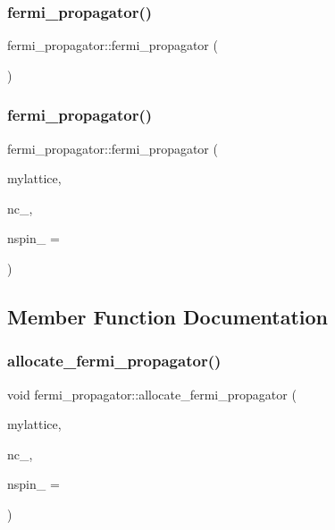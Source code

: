 \subsubsection{\texorpdfstring{fermi\+\_\+propagator()}{fermi\_propagator()}\hspace{0.1cm}{\footnotesize\ttfamily [1/2]}}
{\footnotesize\ttfamily fermi\+\_\+propagator\+::fermi\+\_\+propagator (\begin{DoxyParamCaption}{ }\end{DoxyParamCaption})\hspace{0.3cm}{\ttfamily [inline]}}

\mbox{\label{classfermi__propagator_a41b0242793ca3da9ec2e67cdc05a9149}} 
\subsubsection{\texorpdfstring{fermi\+\_\+propagator()}{fermi\_propagator()}\hspace{0.1cm}{\footnotesize\ttfamily [2/2]}}
{\footnotesize\ttfamily fermi\+\_\+propagator\+::fermi\+\_\+propagator (\begin{DoxyParamCaption}\item[{\hyperlink{classmdp__lattice}{mdp\+\_\+lattice} \&}]{mylattice,  }\item[{int}]{nc\+\_\+,  }\item[{int}]{nspin\+\_\+ = {} }\end{DoxyParamCaption})\hspace{0.3cm}{\ttfamily [inline]}}



\subsection{Member Function Documentation}
\mbox{\label{classfermi__propagator_a8ee1c8631f83f4e4876eff6253c41954}} 
\subsubsection{\texorpdfstring{allocate\+\_\+fermi\+\_\+propagator()}{allocate\_fermi\_propagator()}}
{\footnotesize\ttfamily void fermi\+\_\+propagator\+::allocate\+\_\+fermi\+\_\+propagator (\begin{DoxyParamCaption}\item[{\hyperlink{classmdp__lattice}{mdp\+\_\+lattice} \&}]{mylattice,  }\item[{int}]{nc\+\_\+,  }\item[{int}]{nspin\+\_\+ = {} }\end{DoxyParamCaption})\hspace{0.3cm}{\ttfamily [inline]}}

